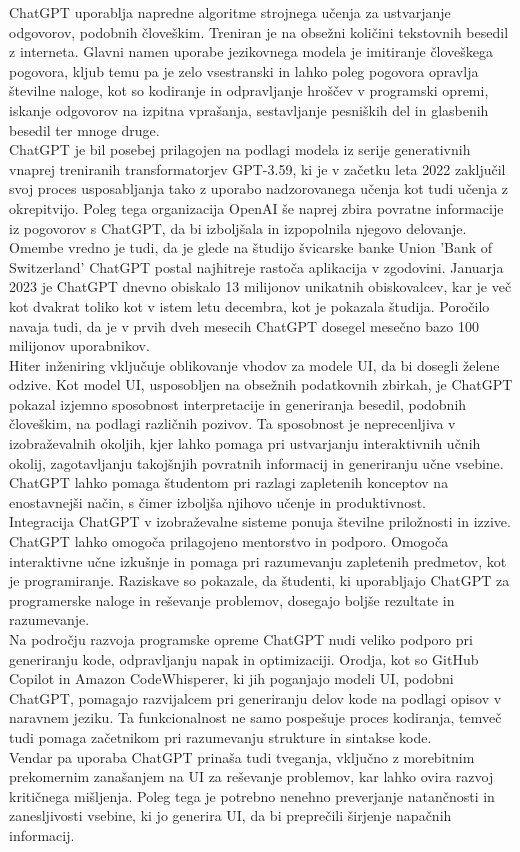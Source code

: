 \documentclass[a4paper,12pt,openright]{book}
\begin{document}
ChatGPT uporablja napredne algoritme strojnega učenja za ustvarjanje odgovorov, podobnih človeškim. Treniran je na obsežni količini tekstovnih besedil z interneta. Glavni namen uporabe jezikovnega modela je imitiranje človeškega pogovora, kljub temu pa je zelo vsestranski in lahko poleg pogovora opravlja številne naloge, kot so kodiranje in odpravljanje hroščev v programski opremi, iskanje odgovorov na izpitna vprašanja, sestavljanje pesniških del in glasbenih besedil ter mnoge druge. \cite{tung2023chatgpt} \\
ChatGPT je bil posebej prilagojen na podlagi modela iz serije generativnih vnaprej treniranih transformatorjev GPT-3.59, ki je v začetku leta 2022 zaključil svoj proces usposabljanja tako z uporabo nadzorovanega učenja kot tudi učenja z okrepitvijo. Poleg tega organizacija OpenAI še naprej zbira povratne informacije iz pogovorov s ChatGPT, da bi izboljšala in izpopolnila njegovo delovanje. Omembe vredno je tudi, da je glede na študijo švicarske banke Union 'Bank of Switzerland' ChatGPT postal najhitreje rastoča aplikacija v zgodovini. Januarja 2023 je ChatGPT dnevno obiskalo 13 milijonov unikatnih obiskovalcev, kar je več kot dvakrat toliko kot v istem letu decembra, kot je pokazala študija. Poročilo navaja tudi, da je v prvih dveh mesecih ChatGPT dosegel mesečno bazo 100 milijonov uporabnikov. \cite{yetistiren2023evaluating} \\

Hiter inženiring vključuje oblikovanje vhodov za modele UI, da bi dosegli želene odzive. Kot model UI, usposobljen na obsežnih podatkovnih zbirkah, je ChatGPT pokazal izjemno sposobnost interpretacije in generiranja besedil, podobnih človeškim, na podlagi različnih pozivov. Ta sposobnost je neprecenljiva v izobraževalnih okoljih, kjer lahko pomaga pri ustvarjanju interaktivnih učnih okolij, zagotavljanju takojšnjih povratnih informacij in generiranju učne vsebine. ChatGPT lahko pomaga študentom pri razlagi zapletenih konceptov na enostavnejši način, s čimer izboljša njihovo učenje in produktivnost. \\
Integracija ChatGPT v izobraževalne sisteme ponuja številne priložnosti in izzive. ChatGPT lahko omogoča prilagojeno mentorstvo in podporo. Omogoča interaktivne učne izkušnje in pomaga pri razumevanju zapletenih predmetov, kot je programiranje. Raziskave so pokazale, da študenti, ki uporabljajo ChatGPT za programerske naloge in reševanje problemov, dosegajo boljše rezultate in razumevanje. \\
Na področju razvoja programske opreme ChatGPT nudi veliko podporo pri generiranju kode, odpravljanju napak in optimizaciji. Orodja, kot so GitHub Copilot in Amazon CodeWhisperer, ki jih poganjajo modeli UI, podobni ChatGPT, pomagajo razvijalcem pri generiranju delov kode na podlagi opisov v naravnem jeziku. Ta funkcionalnost ne samo pospešuje proces kodiranja, temveč tudi pomaga začetnikom pri razumevanju strukture in sintakse kode.
 \\
Vendar pa uporaba ChatGPT prinaša tudi tveganja, vključno z morebitnim prekomernim zanašanjem na UI za reševanje problemov, kar lahko ovira razvoj kritičnega mišljenja. Poleg tega je potrebno nenehno preverjanje natančnosti in zanesljivosti vsebine, ki jo generira UI, da bi preprečili širjenje napačnih informacij. \cite{app13095783}
\end{document}
